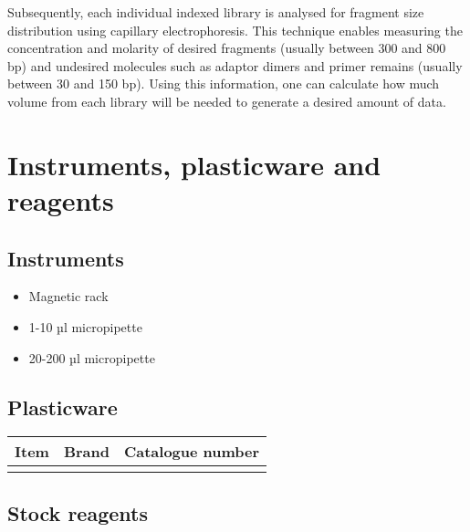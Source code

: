 \documentclass[
]{book}
\providecommand{\tightlist}{%
  \setlength{\itemsep}{0pt}\setlength{\parskip}{0pt}}
\begin{document}
Subsequently, each individual indexed library is analysed for fragment size distribution using capillary electrophoresis. This technique enables measuring the concentration and molarity of desired fragments (usually between 300 and 800 bp) and undesired molecules such as adaptor dimers and primer remains (usually between 30 and 150 bp). Using this information, one can calculate how much volume from each library will be needed to generate a desired amount of data.

\hypertarget{instruments-plasticware-and-reagents-5}{%
\section{Instruments, plasticware and reagents}\label{instruments-plasticware-and-reagents-5}}

\hypertarget{instruments-5}{%
\subsection*{Instruments}\label{instruments-5}}

\begin{itemize}
\tightlist
\item
  Magnetic rack
\item
  1-10 µl micropipette
\item
  20-200 µl micropipette
\end{itemize}

\hypertarget{plasticware-5}{%
\subsection*{Plasticware}\label{plasticware-5}}

\begin{longtable}[]{@{}lll@{}}
\toprule\noalign{}
Item & Brand & Catalogue number \\
\midrule\noalign{}
\endhead
\bottomrule\noalign{}
\endlastfoot
& & \\
\end{longtable}

\hypertarget{stock-reagents-4}{%
\subsection*{Stock reagents}\label{stock-reagents-4}}
\end{document}
